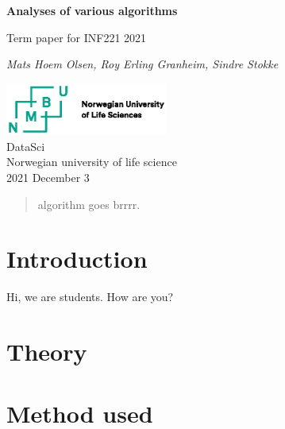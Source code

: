 \documentclass[a4paper,twocolumn]{article}
\begin{document}
\begin{titlepage}
	\begin{center}
		\vspace*{1cm}
		\Huge
		\textbf{Analyses of various algorithms}\\

		\vspace{0.5cm}
		\LARGE

		Term paper for INF221 2021\\

		\vspace{1.5cm}

		\textit{Mats Hoem Olsen, Roy Erling Granheim, Sindre Stokke}\\

		\vfill

		\includegraphics[width=0.4\textwidth]{./tex/pic/logo.eps}\\
		
		\LARGE
		DataSci\\
		Norwegian university of life science\\
		2021 December 3
	\end{center}		
\end{titlepage}

\tableofcontents
\begin{abstract}
algorithm goes brrrr.
\end{abstract}
\newpage

\section{Introduction}

Hi, we are students. How are you?\parencite[see][]{cormen_introduction_2009}

\section{Theory}\label{sec:theory}



\section{Method used}


\end{document}
